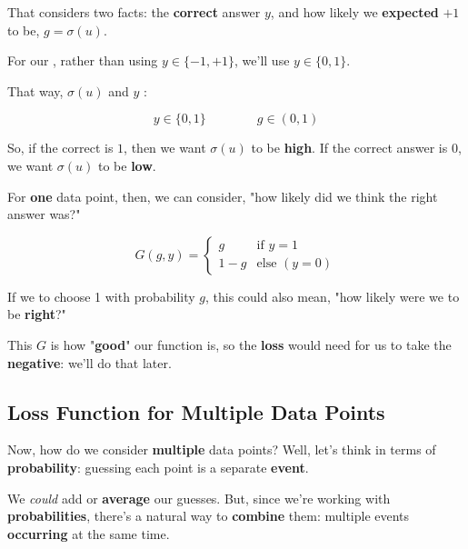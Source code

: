         That considers two facts: the \textbf{correct} answer $y$, and how likely we \textbf{expected} $+1$ to be, $g=\sigma(u)$.\\
        
        \begin{notation}
            For our , rather than using $y \in \{-1,+1\}$, we'll use $ y \in \{0,1\}$.
            
            That way, $\sigma(u)$ and $y$ :
            
            \begin{equation*}
                y \in \{0,1\} \qquad \qquad g \in (0,1)
            \end{equation*}
        \end{notation}
        
        So, if the correct is $1$, then we want $\sigma(u)$ to be \textbf{high}. If the correct answer is $0$, we want $\sigma(u)$ to be \textbf{low}.
        
        For \textbf{one} data point, then, we can consider, "how likely did we think the right answer was?"
        
        \begin{equation}
            G(g,y) = 
            \begin{cases}
                g & \text{if } y=1 \\
                1-g & \text{else } (y=0)
            \end{cases}
        \end{equation}
        
        If we to choose 1 with probability $g$, this could also mean, "how likely were we to be \textbf{right}?"
        
        This $G$ is how "\textbf{good}" our function is, so the \textbf{loss} would need for us to take the \textbf{negative}: we'll do that later.
        
    \subsection*{Loss Function for Multiple Data Points}
    
        Now, how do we consider \textbf{multiple} data points? Well, let's think in terms of \textbf{probability}: guessing each point is a separate \textbf{event}.
        
        We \textit{could} add or \textbf{average} our guesses. But, since we're working with \textbf{probabilities}, there's a natural way to \textbf{combine} them: multiple events \textbf{occurring} at the same time.
        
